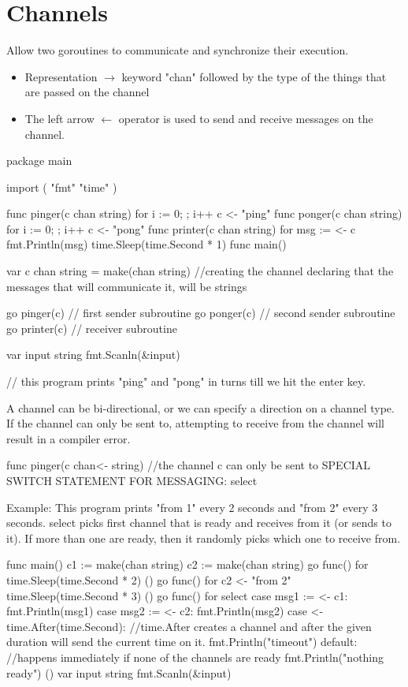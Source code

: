 \documentclass[twoside,a4paper,english]{report}
\begin{document}
\section{Channels}
Allow two goroutines to communicate and synchronize their execution.
\begin{itemize}
\item Representation $\rightarrow$ keyword "chan" followed by the type of the things that are passed on the channel
\item The left arrow $\leftarrow$ operator is used to send and receive messages on the channel.
\end{itemize}
\begin{go}
package main

import (
  "fmt"
  "time" 
)

func pinger(c chan string) {
  for i := 0; ; i++ {
    c <- "ping" 
  }
}
func ponger(c chan string) {
  for i := 0; ; i++ {
    c <- "pong" 
  }
}
func printer(c chan string) {
  for {
    msg := <- c
    fmt.Println(msg)
    time.Sleep(time.Second * 1)
  }
}
func main() {
  var c chan string = make(chan string)  //creating the channel declaring that the messages that will communicate it, will be strings

  go pinger(c)  // first sender subroutine
  go ponger(c)  // second sender subroutine
  go printer(c) // receiver subroutine

  var input string
  fmt.Scanln(&input)
}

  // this program prints "ping" and "pong" in turns till we hit the enter key.
\end{go}
\vspace{0.7cm}
A channel can be bi-directional, or we can specify a direction on a channel type. If the channel can only be sent to, attempting to receive from the channel will result in a compiler error.
\begin{go}
func pinger(c chan<- string) //the channel c can only be sent to SPECIAL SWITCH STATEMENT FOR MESSAGING: select
\end{go}
\vspace{0.7cm}
Example: This program prints "from 1" every 2 seconds and "from 2" every 3 seconds. select picks first channel that is ready and receives from it (or sends to it). If more than one are ready, then it randomly picks which one to receive from.
\begin{go}
func main() {
  c1 := make(chan string)
  c2 := make(chan string)
  go func() {
    for {
      time.Sleep(time.Second * 2)
    }
  }()
  go func() {
    for {
      c2 <- "from 2"
      time.Sleep(time.Second * 3)
    }
  }()
  go func() {
    for {
      select {
        case msg1 := <- c1:
          fmt.Println(msg1)
        case msg2 := <- c2:
          fmt.Println(msg2)
        case <- time.After(time.Second): //time.After creates a channel and after the given duration will send the current time on it.
          fmt.Println("timeout") 
        default: //happens immediately if none of the channels are ready
          fmt.Println("nothing ready")    
      } 
    }
  }()
  var input string
  fmt.Scanln(&input)
}   
\end{go}
\end{document}

